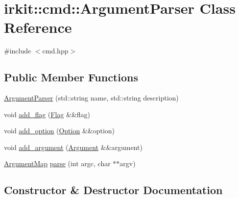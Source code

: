 \hypertarget{classirkit_1_1cmd_1_1ArgumentParser}{}\section{irkit\+:\+:cmd\+:\+:Argument\+Parser Class Reference}
\label{classirkit_1_1cmd_1_1ArgumentParser}


{\ttfamily \#include $<$cmd.\+hpp$>$}

\subsection*{Public Member Functions}
\begin{DoxyCompactItemize}
\item 
\mbox{\hyperlink{classirkit_1_1cmd_1_1ArgumentParser_ae861be98ca4511aeb8fcfcb41a53537f}{Argument\+Parser}} (std\+::string name, std\+::string description)
\item 
void \mbox{\hyperlink{classirkit_1_1cmd_1_1ArgumentParser_a0915e82ef67a76359aa175448e4991bb}{add\+\_\+flag}} (\mbox{\hyperlink{classirkit_1_1cmd_1_1Flag}{Flag}} \&\&flag)
\item 
void \mbox{\hyperlink{classirkit_1_1cmd_1_1ArgumentParser_a13322fbd3458490faf4537442b308605}{add\+\_\+option}} (\mbox{\hyperlink{classirkit_1_1cmd_1_1Option}{Option}} \&\&option)
\item 
void \mbox{\hyperlink{classirkit_1_1cmd_1_1ArgumentParser_aa3ba2497953018934b66b7fc2989bd66}{add\+\_\+argument}} (\mbox{\hyperlink{classirkit_1_1cmd_1_1Argument}{Argument}} \&\&argument)
\item 
\mbox{\hyperlink{classirkit_1_1cmd_1_1ArgumentMap}{Argument\+Map}} \mbox{\hyperlink{classirkit_1_1cmd_1_1ArgumentParser_a932ef050329d4f1f1da4812eb3a8b721}{parse}} (int argc, char $\ast$$\ast$argv)
\end{DoxyCompactItemize}


\subsection{Constructor \& Destructor Documentation}
\mbox{\label{classirkit_1_1cmd_1_1ArgumentParser_ae861be98ca4511aeb8fcfcb41a53537f}} 
